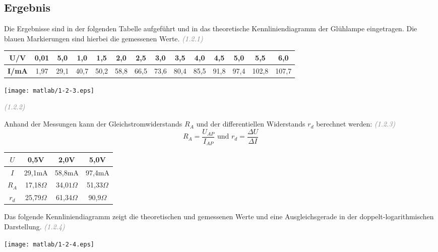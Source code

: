 	\subsection{Ergebnis}

	Die Ergebnisse sind in der folgenden Tabelle aufgeführt und in das theoretische Kennliniendiagramm der Glühlampe eingetragen. Die blauen Markierungen sind hierbei die gemessenen Werte. \textcolor{gray}{\textit{(1.2.1)}}\\
	
		\begin{tabular}{|c|c|c|c|c|c|c|c|c|c|c|c|c|c|}
			\hline 
			\textbf{U/V}& 0,01 & 5,0 & 1,0 & 1,5 & 2,0 & 2,5 & 3,0 & 3,5 & 4,0 & 4,5 & 5,0 & 5,5 & 6,0 \\  
			\hline 
			\textbf{I/mA}& 1,97 & 29,1 & 40,7 & 50,2 & 58,8 & 66,5 & 73,6 & 80,4 & 85,5 & 91,8 & 97,4 &102,8  & 107,7 \\
			\hline 
		\end{tabular}

	
	\begin{center}
		\texttt{[image: matlab/1-2-3.eps]}
	\end{center}
	\textcolor{gray}{\textit{(1.2.2)}}
\newpage
\thispagestyle{fancy}

	Anhand der Messungen kann der  Gleichstromwiderstands $R_A$ und der differentiellen Widerstands $r_d$ berechnet werden: \textcolor{gray}{\textit{(1.2.3)}}
	\vspace{0.5cm}
	\begin{equation*}
	R_A = \frac{U_{AP}}{I_{AP}} \text{  und  } r_d = \frac{\varDelta U}{\varDelta I}
	\end{equation*}
	\vspace{0.5cm}
	\begin{center}

	\begin{tabular}{|c|c|c|c|}
		\hline 
		\textbf{$U$}&  \textbf{0,5V} & \textbf{2,0V} &\textbf{ 5,0V}  \\ 
		\hline 
		\textbf{$I$}& 29,1mA & 58,8mA & 97,4mA \\ 
		\hline 
		\textbf{$R_A$}& 17,18$\Omega$ & 34,0$1\Omega$ & 51,33$\Omega$  \\ 
		\hline 
		\textbf{$r_d$}& 25,79$\Omega$ & 61,34$\Omega$ & 90,9$\Omega$  \\ 
		\hline 
	\end{tabular} 
	
	\end{center}
	Das folgende Kennliniendiagramm zeigt die theoretischen und gemessenen Werte und eine Ausgleichsgerade in der doppelt-logarithmischen Darstellung. \textcolor{gray}{\textit{(1.2.4)}}
	\begin{center}
		\texttt{[image: matlab/1-2-4.eps]}
	\end{center}
	
